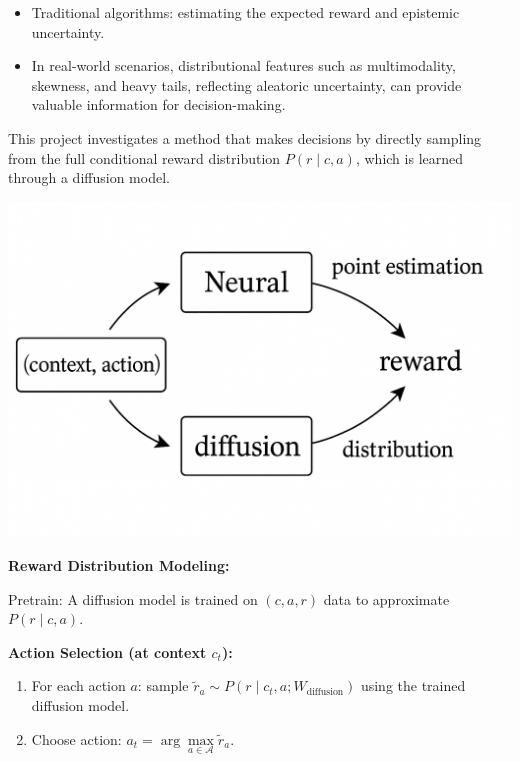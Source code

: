 \begin{itemize}
    \item Traditional algorithms: estimating the expected reward and epistemic uncertainty. 
    \item In real-world scenarios, distributional features such as multimodality, skewness, and heavy tails, reflecting aleatoric uncertainty, can provide valuable information for decision-making.
\end{itemize}
    \begin{minipage}[t]{0.45\linewidth}
    \vspace{10pt} %
    This project investigates a method that makes decisions by directly sampling from the full conditional reward distribution $P(r \mid c, a)$, which is learned through a diffusion model.
    \end{minipage}
\hfill
\begin{minipage}[t]{0.48\linewidth}
\vspace{0pt}
    \includegraphics[width=\linewidth]{Img/context_diffusion.png}
\end{minipage}
\textbf{Reward Distribution Modeling:}

Pretrain: A diffusion model is trained on $(c, a, r)$ data to approximate $P(r \mid c, a)$.

\textbf{Action Selection (at context $c_t$):}
\begin{enumerate}
    \item For each action $a$: sample $\tilde{r}_a \sim P(r \mid c_t, a; W_{\text{diffusion}})$ using the trained diffusion model.
    \item Choose action: $a_t = \arg\max\limits_{a \in \mathcal{A}} \tilde{r}_a$.
\end{enumerate}
